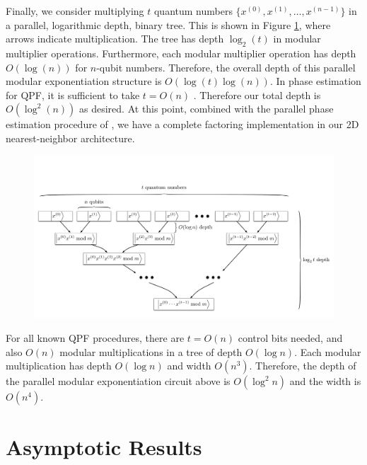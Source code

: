 \documentclass[twoside]{article}
\begin{document}
Finally, we consider multiplying $t$ quantum numbers
$\{x^{(0)}, x^{(1)}, \ldots, x^{(n-1)}\}$ in a parallel,
logarithmic depth, binary tree.
This is shown in Figure \ref{fig:modexp-qq-parallel}, where arrows indicate multiplication.
The tree has depth $\log_2(t)$ in modular multiplier operations. Furthermore,
each
modular multiplier operation has depth $O(\log(n))$ for $n$-qubit
numbers. Therefore, the overall depth of this parallel modular exponentiation
structure is $O(\log(t)\log(n))$. In phase estimation for QPF, it is
sufficient to take $t = O(n)$ \cite{Nielsen2000,Kitaev2002}. Therefore our total depth is
$O(\log^2(n))$ as desired. At this point, combined with the parallel phase
estimation procedure of \cite{Kitaev2002}, we have a complete factoring
implementation in our 2D nearest-neighbor architecture.
%
\begin{figure}[tb!]
\centerline{
\includegraphics[width=5.5in]{./mod-exp-par.pdf}
}
\label{fig:modexp-qq-parallel}
\end{figure}

For all known QPF procedures, there are $t=O(n)$ control bits needed, and
also $O(n)$ modular multiplications in a tree of depth $O(\log n)$.
Each modular multiplication has
depth $O(\log n)$ and width $O(n^3)$.
Therefore, the depth of the parallel modular exponentiation circuit above
is $O(\log^2 n)$ and the width is $O(n^4)$.


%
\section{Asymptotic Results}
\label{sec:results}
\end{document}
